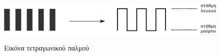 \documentclass[a4paper,11pt,titlepage]{article}
\begin{document}
\begin{figure}[h!]
\centering
\includegraphics[width=120mm]{bw.pdf}\\[0.3cm]
\caption{Εικόνα τετραγωνικού παλμού}
\end{figure}
\end{document}
